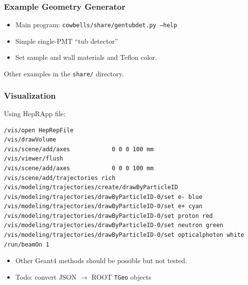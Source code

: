 \documentclass[xcolor=dvipsnames]{beamer}
\begin{document}
\begin{frame}
  \frametitle{Example Geometry Generator}
  \begin{itemize}
  \item Main program: \texttt{cowbells/share/gentubdet.py --help}
  \item Simple single-PMT ``tub detector''
  \item Set sample and wall materials and Teflon color.
  \end{itemize}
  Other examples in the \texttt{share/} directory.
\end{frame}

\begin{frame}[fragile]
  \frametitle{Visualization}

  Using HepRApp file:
  \begin{lstlisting}
/vis/open HepRepFile 
/vis/drawVolume
/vis/scene/add/axes            0 0 0 100 mm
/vis/viewer/flush
/vis/scene/add/axes            0 0 0 100 mm
/vis/scene/add/trajectories rich
/vis/modeling/trajectories/create/drawByParticleID
/vis/modeling/trajectories/drawByParticleID-0/set e- blue
/vis/modeling/trajectories/drawByParticleID-0/set e+ cyan
/vis/modeling/trajectories/drawByParticleID-0/set proton red
/vis/modeling/trajectories/drawByParticleID-0/set neutron green
/vis/modeling/trajectories/drawByParticleID-0/set opticalphoton white
/run/beamOn 1
  \end{lstlisting}
  \begin{itemize}
  \item Other Geant4 methods should be possible but not tested.
  \item Todo: convert JSON $\to$ ROOT \texttt{TGeo} objects
  \end{itemize}
\end{frame}
\end{document}
